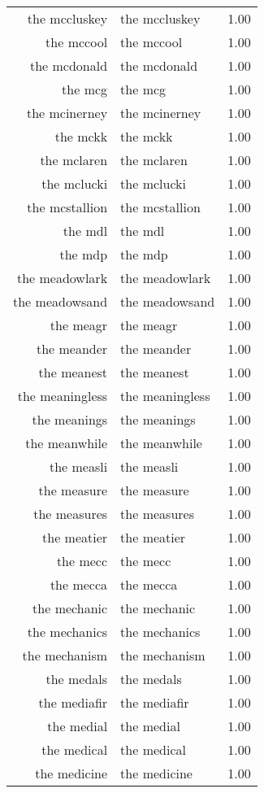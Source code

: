 \begin{table}[ht]
\begin{tabular}{rlr}
  the mccluskey & the mccluskey & 1.00 \\ 
  the mccool & the mccool & 1.00 \\ 
  the mcdonald & the mcdonald & 1.00 \\ 
  the mcg & the mcg & 1.00 \\ 
  the mcinerney & the mcinerney & 1.00 \\ 
  the mckk & the mckk & 1.00 \\ 
  the mclaren & the mclaren & 1.00 \\ 
  the mclucki & the mclucki & 1.00 \\ 
  the mcstallion & the mcstallion & 1.00 \\ 
  the mdl & the mdl & 1.00 \\ 
  the mdp & the mdp & 1.00 \\ 
  the meadowlark & the meadowlark & 1.00 \\ 
  the meadowsand & the meadowsand & 1.00 \\ 
  the meagr & the meagr & 1.00 \\ 
  the meander & the meander & 1.00 \\ 
  the meanest & the meanest & 1.00 \\ 
  the meaningless & the meaningless & 1.00 \\ 
  the meanings & the meanings & 1.00 \\ 
  the meanwhile & the meanwhile & 1.00 \\ 
  the measli & the measli & 1.00 \\ 
  the measure & the measure & 1.00 \\ 
  the measures & the measures & 1.00 \\ 
  the meatier & the meatier & 1.00 \\ 
  the mecc & the mecc & 1.00 \\ 
  the mecca & the mecca & 1.00 \\ 
  the mechanic & the mechanic & 1.00 \\ 
  the mechanics & the mechanics & 1.00 \\ 
  the mechanism & the mechanism & 1.00 \\ 
  the medals & the medals & 1.00 \\ 
  the mediafir & the mediafir & 1.00 \\ 
  the medial & the medial & 1.00 \\ 
  the medical & the medical & 1.00 \\ 
  the medicine & the medicine & 1.00 \\ 

\end{tabular}
\end{table}
